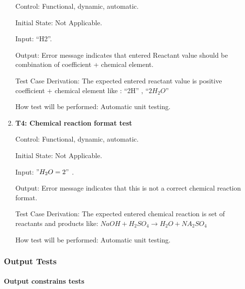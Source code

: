 \documentclass[12pt, titlepage]{article}
\begin{document}
\begin{enumerate}
Control: Functional, dynamic, automatic.
					
Initial State: Not Applicable.
					
Input: ``H2''.
					
Output: Error message indicates that entered Reactant value should be
combination of coefficient + chemical element. 

Test Case Derivation: The expected entered reactant value is positive
coefficient + chemical element like : ``2H'' , ``$2H_2O$''
					
How test will be performed: Automatic unit testing.


\item{\bf T4: Chemical reaction format test\\}

Control: Functional, dynamic, automatic.
					
Initial State: Not Applicable.
					
Input: $"H_2O = 2"$ . 
					
Output: Error message indicates that this is not a correct chemical reaction
format.

Test Case Derivation: The expected entered chemical reaction is set of reactants
and products like: $NaOH + H_2SO_4 \rightarrow H_2O + NA_2SO_4$
					
How test will be performed: Automatic unit testing.
 
\end{enumerate}

\subsubsection{Output Tests}

\paragraph{Output constrains tests}
\end{document}
